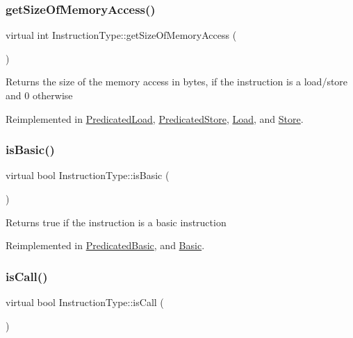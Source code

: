 \subsubsection{\texorpdfstring{get\+Size\+Of\+Memory\+Access()}{getSizeOfMemoryAccess()}}
{\footnotesize\ttfamily virtual int Instruction\+Type\+::get\+Size\+Of\+Memory\+Access (\begin{DoxyParamCaption}{ }\end{DoxyParamCaption})\hspace{0.3cm}{\ttfamily [virtual]}}

Returns the size of the memory access in bytes, if the instruction is a load/store and 0 otherwise 

Reimplemented in \hyperlink{classPredicatedLoad_a0f4d0a0830281e9f87c733eb253a1a5e}{Predicated\+Load}, \hyperlink{classPredicatedStore_a79f5e84001443055c5ae0547ec337759}{Predicated\+Store}, \hyperlink{classLoad_a35d504d74dfa9ea02ae719f41dd766a8}{Load}, and \hyperlink{classStore_a1b788e1fc3364a4eb304a2611ad37415}{Store}.

\mbox{\label{classInstructionType_ada75c9091ab7e6b4b9a7df984288d1f8}} 
\subsubsection{\texorpdfstring{is\+Basic()}{isBasic()}}
{\footnotesize\ttfamily virtual bool Instruction\+Type\+::is\+Basic (\begin{DoxyParamCaption}{ }\end{DoxyParamCaption})\hspace{0.3cm}{\ttfamily [virtual]}}

Returns true if the instruction is a basic instruction 

Reimplemented in \hyperlink{classPredicatedBasic_ad3f2e7d2feaef666dd784fcae0f03125}{Predicated\+Basic}, and \hyperlink{classBasic_a3ab68a71a2c405d7e14a11a8ce24fd07}{Basic}.

\mbox{\label{classInstructionType_ad49a039e3b57e3b7b369a7c0c6c0932b}} 
\subsubsection{\texorpdfstring{is\+Call()}{isCall()}}
{\footnotesize\ttfamily virtual bool Instruction\+Type\+::is\+Call (\begin{DoxyParamCaption}{ }\end{DoxyParamCaption})\hspace{0.3cm}{\ttfamily [virtual]}}

